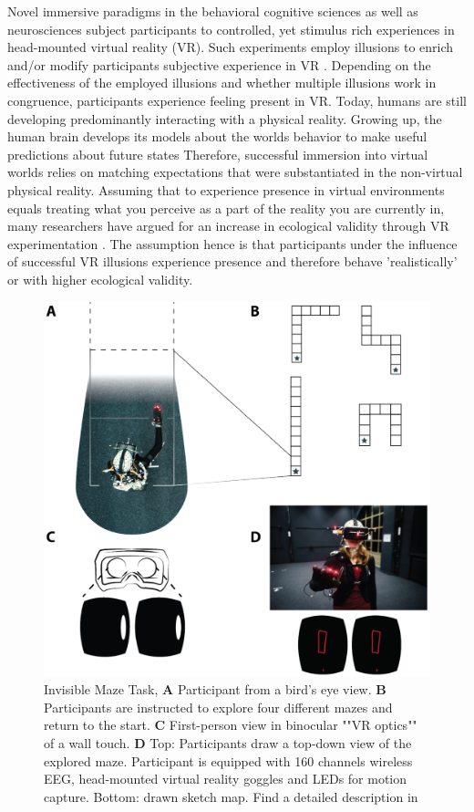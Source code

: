 
Novel immersive paradigms in the behavioral cognitive sciences as well as neurosciences subject participants to controlled, yet stimulus rich experiences in head-mounted virtual reality (VR). Such experiments employ illusions to enrich and/or modify participants subjective experience in VR \citep{Gonzalez-Franco2017}. Depending on the effectiveness of the employed illusions and whether multiple illusions work in congruence, participants experience feeling present in VR. Today, humans are still developing predominantly interacting with a physical reality. Growing up, the human brain develops its models about the worlds behavior to make useful predictions about future states \cite{} %
Therefore, successful immersion into virtual worlds relies on matching expectations that were substantiated in the non-virtual physical reality. Assuming that to experience presence in virtual environments equals treating what you perceive as a part of the reality you are currently in, many researchers have argued for an increase in ecological validity through VR experimentation \citep{Bohil2011, Parsons2015, Parsons2017}. The assumption hence is that participants under the influence of successful VR illusions experience presence and therefore behave 'realistically' or with higher ecological validity.

\begin{figure}[h]
\centering
\includegraphics[width=.8\linewidth]{figures/IMT_Task.png}
\vspace{0pt}
\caption{Invisible Maze Task, \textbf{A} Participant from a bird’s eye view. \textbf{B} Participants are instructed to explore four different mazes and return to the start. \textbf{C} First-person view in binocular ""VR optics"" of a wall touch. \textbf{D} Top: Participants draw a top-down view of the explored maze. Participant is equipped with 160 channels wireless EEG, head-mounted virtual reality goggles and LEDs for motion capture. Bottom: drawn sketch map. Find a detailed description in \citep{Gehrke2018}}
\label{imt_task}
\end{figure}

